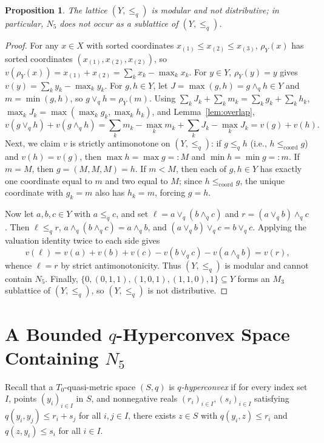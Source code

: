 \documentclass[11pt]{article}
\newtheorem{proposition}[theorem]{Proposition}
\begin{document}
\begin{proposition}\label{prop:Y}
The lattice $(Y, \le_q)$ is modular and not distributive; in particular, $N_5$
does not occur as a sublattice of $(Y, \le_q)$.
\end{proposition}

\begin{proof}
For any $x \in X$ with sorted coordinates $x_{(1)} \le x_{(2)} \le x_{(3)}$,
$\rho_Y(x)$ has sorted coordinates $(x_{(1)}, x_{(2)}, x_{(2)})$, so
$v(\rho_Y(x)) = x_{(1)} + x_{(2)} = \sum_k x_k - \max_k x_k$. For $y \in Y$,
$\rho_Y(y) = y$ gives $v(y) = \sum_k y_k - \max_k y_k$. For $g, h \in Y$, let
$J = \max(g, h) = g \wedge_q h \in Y$ and $m = \min(g, h)$, so
$g \vee_q h = \rho_Y(m)$. Using $\sum_k J_k + \sum_k m_k = \sum_k g_k + \sum_k h_k$,
$\max_k J_k = \max(\max_k g_k, \max_k h_k)$, and Lemma~\ref{lem:overlap},
\[
v(g \vee_q h) + v(g \wedge_q h)
= \sum_k m_k - \max_k m_k + \sum_k J_k - \max_k J_k
= v(g) + v(h).
\]
Next, we claim $v$ is strictly antimonotone on $(Y, \le_q)$: if $g \le_q h$
(i.e., $h \le_{\mathrm{coord}} g$) and $v(h) = v(g)$, then $\max h = \max g =: M$
and $\min h = \min g =: m$. If $m = M$, then $g = (M, M, M) = h$. If $m < M$,
then each of $g, h \in Y$ has exactly one coordinate equal to $m$ and two equal
to $M$; since $h \le_{\mathrm{coord}} g$, the unique coordinate with $g_k = m$
also has $h_k = m$, forcing $g = h$.

Now let $a, b, c \in Y$ with $a \le_q c$, and set $\ell = a \vee_q (b \wedge_q c)$
and $r = (a \vee_q b) \wedge_q c$. Then $\ell \le_q r$,
$a \wedge_q (b \wedge_q c) = a \wedge_q b$, and $(a \vee_q b) \vee_q c = b \vee_q c$.
Applying the valuation identity twice to each side gives
\[
v(\ell) = v(a) + v(b) + v(c) - v(b \vee_q c) - v(a \wedge_q b) = v(r),
\]
whence $\ell = r$ by strict antimonotonicity. Thus $(Y, \le_q)$ is modular and
cannot contain $N_5$. Finally, $\{0, (0,1,1), (1,0,1), (1,1,0), 1\} \subseteq Y$
forms an $M_3$ sublattice of $(Y, \le_q)$, so $(Y, \le_q)$ is not distributive.
\end{proof}

\section{A Bounded $q$-Hyperconvex Space Containing $N_5$}

Recall that a $T_0$-quasi-metric space $(S, q)$ is \emph{$q$-hyperconvex} if
for every index set $I$, points $(y_i)_{i \in I}$ in $S$, and nonnegative reals
$(r_i)_{i \in I}, (s_i)_{i \in I}$ satisfying $q(y_i, y_j) \le r_i + s_j$ for
all $i, j \in I$, there exists $z \in S$ with $q(y_i, z) \le r_i$ and
$q(z, y_i) \le s_i$ for all $i \in I$.
\end{document}
